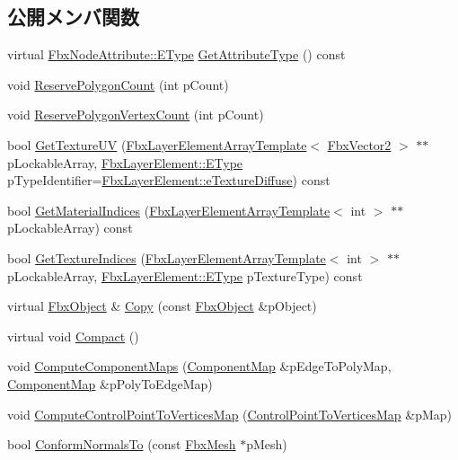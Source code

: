 \subsection*{公開メンバ関数}
\begin{DoxyCompactItemize}
\item 
virtual \hyperlink{class_fbx_node_attribute_a08e1669d3d1a696910756ab17de56d6a}{Fbx\+Node\+Attribute\+::\+E\+Type} \hyperlink{class_fbx_mesh_a5a52e41ccf1382c40d3361ec3cfbb68a}{Get\+Attribute\+Type} () const
\item 
void \hyperlink{class_fbx_mesh_ab7d47000aac6c7de0a6fe0ccaff248cd}{Reserve\+Polygon\+Count} (int p\+Count)
\item 
void \hyperlink{class_fbx_mesh_a6cb8ace34a7b945a249a73f5293075e4}{Reserve\+Polygon\+Vertex\+Count} (int p\+Count)
\item 
bool \hyperlink{class_fbx_mesh_acb576494ab0812b3a81207d4b3423a5c}{Get\+Texture\+UV} (\hyperlink{class_fbx_layer_element_array_template}{Fbx\+Layer\+Element\+Array\+Template}$<$ \hyperlink{class_fbx_vector2}{Fbx\+Vector2} $>$ $\ast$$\ast$p\+Lockable\+Array, \hyperlink{class_fbx_layer_element_a8c95c5cd880b56c776acd379bd86f42c}{Fbx\+Layer\+Element\+::\+E\+Type} p\+Type\+Identifier=\hyperlink{class_fbx_layer_element_a8c95c5cd880b56c776acd379bd86f42ca09829e6ecf512e7ae04d9ad8de1342fa}{Fbx\+Layer\+Element\+::e\+Texture\+Diffuse}) const
\item 
bool \hyperlink{class_fbx_mesh_a1929aa2f73049a3c6d07b06b5e8db233}{Get\+Material\+Indices} (\hyperlink{class_fbx_layer_element_array_template}{Fbx\+Layer\+Element\+Array\+Template}$<$ int $>$ $\ast$$\ast$p\+Lockable\+Array) const
\item 
bool \hyperlink{class_fbx_mesh_a33c7d29e88d7bb03e0343daca267d770}{Get\+Texture\+Indices} (\hyperlink{class_fbx_layer_element_array_template}{Fbx\+Layer\+Element\+Array\+Template}$<$ int $>$ $\ast$$\ast$p\+Lockable\+Array, \hyperlink{class_fbx_layer_element_a8c95c5cd880b56c776acd379bd86f42c}{Fbx\+Layer\+Element\+::\+E\+Type} p\+Texture\+Type) const
\item 
virtual \hyperlink{class_fbx_object}{Fbx\+Object} \& \hyperlink{class_fbx_mesh_a0f041743536ee5ccbc9a086e3ef1c663}{Copy} (const \hyperlink{class_fbx_object}{Fbx\+Object} \&p\+Object)
\item 
virtual void \hyperlink{class_fbx_mesh_a05ca6a8fbd028777c91931ce6edf4b19}{Compact} ()
\item 
void \hyperlink{class_fbx_mesh_add00ef9f41759119264e83765697564e}{Compute\+Component\+Maps} (\hyperlink{struct_fbx_mesh_1_1_component_map}{Component\+Map} \&p\+Edge\+To\+Poly\+Map, \hyperlink{struct_fbx_mesh_1_1_component_map}{Component\+Map} \&p\+Poly\+To\+Edge\+Map)
\item 
void \hyperlink{class_fbx_mesh_a6e64bf4157a20a29bf548be6dd8d90df}{Compute\+Control\+Point\+To\+Vertices\+Map} (\hyperlink{class_fbx_mesh_1_1_control_point_to_vertices_map}{Control\+Point\+To\+Vertices\+Map} \&p\+Map)
\item 
bool \hyperlink{class_fbx_mesh_ac6499edbc0a86efac04bf2591756ed1e}{Conform\+Normals\+To} (const \hyperlink{class_fbx_mesh}{Fbx\+Mesh} $\ast$p\+Mesh)
\end{DoxyCompactItemize}

